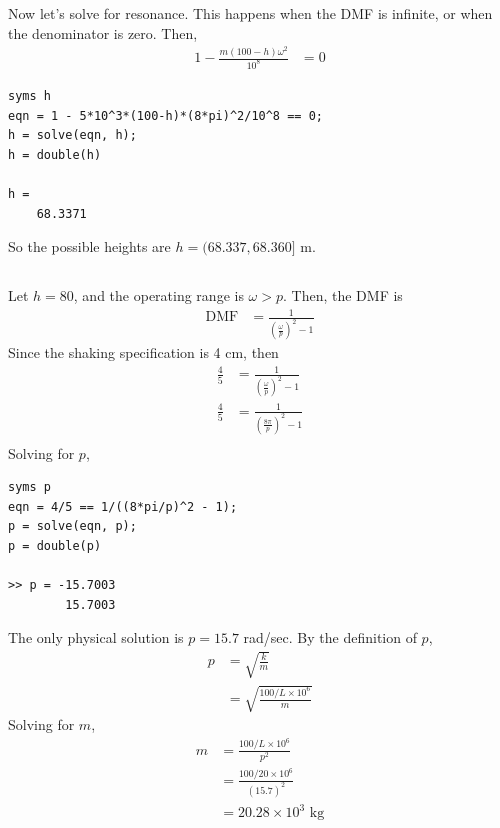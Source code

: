 Now let's solve for resonance. This happens when the DMF is infinite, or when the denominator is zero. Then,
\begin{align*}
    1 - \frac{m(100 - h)\omega^2}{10^8} &= 0 
\end{align*}
\begin{verbatim}
syms h
eqn = 1 - 5*10^3*(100-h)*(8*pi)^2/10^8 == 0;
h = solve(eqn, h);
h = double(h)

h =
    68.3371
\end{verbatim}
So the possible heights are $\boxed{h = (68.337, 68.360] \text{ m}}$.

\subsection{}
Let $h = 80$, and the operating range is $\omega > p$. Then, the DMF is
\begin{align*}
    \text{DMF} &= \frac{1}{\left(\frac{\omega}{p}\right)^2 - 1}
\end{align*}
Since the shaking specification is 4 cm, then
\begin{align*}
    \frac{4}{5} &= \frac{1}{\left(\frac{\omega}{p}\right)^2 - 1} \\
    \frac{4}{5} &= \frac{1}{\left(\frac{8\pi}{p}\right)^2 - 1} \\
\end{align*}
Solving for $p$, 
\begin{verbatim}
syms p
eqn = 4/5 == 1/((8*pi/p)^2 - 1);
p = solve(eqn, p);
p = double(p)

>> p = -15.7003
        15.7003
\end{verbatim}
The only physical solution is $p = 15.7$ rad/sec.
By the definition of $p$,
\begin{align*}
    p &= \sqrt{\frac{k}{m}} \\
    &= \sqrt{\frac{100/L \times 10^6}{m}} 
\end{align*}
Solving for $m$,
\begin{align*}
    m &= \frac{100/L \times 10^6}{p^2} \\
    &= \frac{100/20 \times 10^6}{(15.7)^2} \\
    &= \boxed{20.28 \times 10^3 \text{ kg}}
\end{align*}

